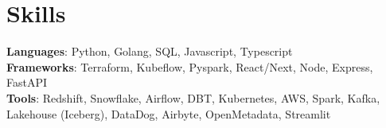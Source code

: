 \section{Skills}
 \begin{itemize}[leftmargin=0.15in, label={}]
    \small{\item{
     \textbf{Languages}{: Python, Golang, SQL, Javascript, Typescript} \\
     \textbf{Frameworks}{: Terraform, Kubeflow, Pyspark, React/Next, Node, Express, FastAPI} \\
     \textbf{Tools}{: Redshift, Snowflake, Airflow, DBT, Kubernetes, AWS, Spark, Kafka, Lakehouse (Iceberg), DataDog, Airbyte, OpenMetadata, Streamlit} \\
    }}
 \end{itemize}
